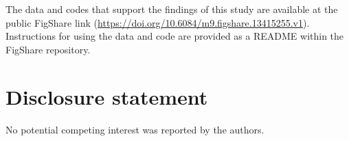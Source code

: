 \documentclass[]{interact}
\theoremstyle{plain}%
\theoremstyle{definition}
\theoremstyle{remark}
\begin{document}
The data and codes that support the findings of this study are available
at the public FigShare link
(\url{https://doi.org/10.6084/m9.figshare.13415255.v1}). Instructions
for using the data and code are provided as a README within the FigShare
repository.

\hypertarget{disclosure-statement}{%
\section*{Disclosure statement}\label{disclosure-statement}}

No potential competing interest was reported by the authors.



\end{document}
